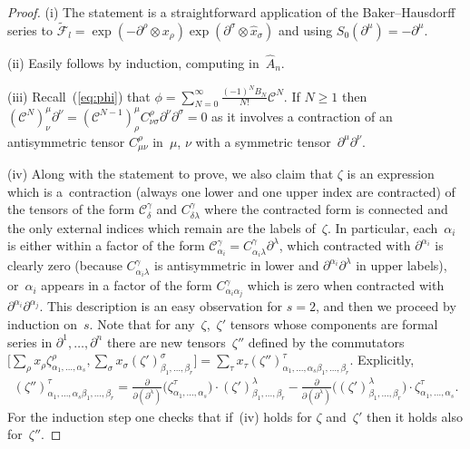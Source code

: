 \documentclass[10pt,a4paper]{amsart}
\def\CC{\mathcal{C}}
\def\hx{\hat{x}}
\numberwithin{equation}{section}
\begin{document}
\begin{proof}(i) The statement is a straightforward application of the Baker--Hausdorff series to $\tilde{\mathcal{F}}_l=\exp(-\partial^\rho\otimes x_\rho)\exp(\partial^\sigma\otimes\hx_\sigma)$ and using $S_0(\partial^\mu)=-\partial^\mu$.

(ii) Easily follows by induction, computing in~$\hat{A}_n$.

(iii) Recall~(\ref{eq:phi}) that $\phi = \sum\limits_{N=0}^\infty \frac{(-1)^N B_N}{N!} \CC^N$. If $N\geq 1$ then $(\mathcal{C}^N)^\mu_\nu\partial^\nu = (\mathcal{C}^{N-1})^\mu_\rho C^\rho_{\nu\sigma}\partial^\nu\partial^\sigma = 0$ as it involves a contraction of an antisymmetric tensor $C^\rho_{\mu\nu}$ in~$\mu$, $\nu$ with a symmetric tensor~$\partial^\mu\partial^\nu$.

(iv) Along with the statement to prove, we also claim that $\zeta$ is an expression which is a~contraction (always one lower and one upper index are contracted) of the tensors of the form $\mathcal{C}^\gamma_\delta$ and $C^\gamma_{\delta\lambda}$ where the contracted form is connected and the only external indices which remain are the labels of~$\zeta$. In particular, each~$\alpha_i$ is either within a factor of the form $\mathcal{C}^\gamma_{\alpha_i} = C^\gamma_{\alpha_i\lambda}\partial^\lambda$, which contracted with $\partial^{\alpha_i}$ is clearly zero (because $C^\gamma_{\alpha_i\lambda}$ is antisymmetric in lower and $\partial^{\alpha_i}\partial^\lambda$ in upper labels), or~$\alpha_i$ appears in a factor of the form $C^\gamma_{\alpha_i\alpha_j}$ which is zero when contracted with~$\partial^{\alpha_i}\partial^{\alpha_j}$. This description is an easy observation for $s = 2$, and then we proceed by induction on~$s$. Note that for any~$\zeta$,~$\zeta'$ tensors whose components are formal series in $\partial^1,\dots,\partial^n$ there are new tensors~$\zeta''$ defined by the commutators $\big[\sum_\rho x_\rho\zeta^\rho_{\alpha_1,\dots,\alpha_s},\sum_\sigma x_\sigma(\zeta')^\sigma_{\beta_1,\dots,\beta_r}\big] = \sum_\tau x_\tau(\zeta'')^\tau_{\alpha_1,\dots,\alpha_s\beta_1,\dots,\beta_r}$. Explicitly,{\samepage
\begin{gather*}
(\zeta'')^\tau_{\alpha_1,\dots,\alpha_s\beta_1,\dots,\beta_r} =
\frac{\partial}{\partial(\partial^\lambda)}\big(\zeta^\tau_{\alpha_1,\dots,\alpha_s}\big) \cdot(\zeta')^\lambda_{\beta_1,\dots,\beta_r}-\frac{\partial}{\partial(\partial^\lambda)}\big((\zeta')^\lambda_{\beta_1,\dots,\beta_r}\big) \cdot\zeta^\tau_{\alpha_1,\dots,\alpha_s}.
\end{gather*}
For the induction step one checks that if~(iv) holds for $\zeta$ and~$\zeta'$ then it holds also for~$\zeta''$.}


\end{proof}
\end{document}
